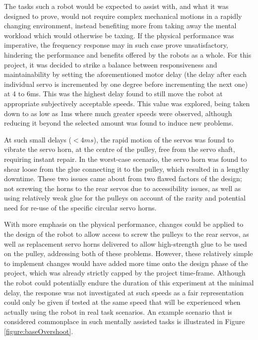 \documentclass[11pt]{article}
\begin{document}
The tasks such a robot would be expected to assist with, and what it was designed to prove, would not require complex mechanical motions in a rapidly changing environment, instead benefiting more from taking away the mental workload which would otherwise be taxing. If the physical performance was imperative, the frequency response may in such case prove unsatisfactory, hindering the performance and benefits offered by the robots as a whole. For this project, it was decided to strike a balance between responsiveness and maintainability by setting the aforementioned motor delay (the delay after each individual servo is incremented by one degree before incrementing the next one) at 4 to 6ms. This was the highest delay found to still move the robot at appropriate subjectively acceptable speeds. This value was explored, being taken down to as low as 1ms where much greater speeds were observed, although reducing it beyond the selected amount was found to induce new problems. 

At such small delays ($<4ms$), the rapid motion of the servos was found to vibrate the servo horn, at the centre of the pulley, free from the servo shaft, requiring instant repair. In the worst-case scenario, the servo horn was found to shear loose from the glue connecting it to the pulley, which resulted in a lengthy downtime. These two issues came about from two flawed factors of the design; not screwing the horns to the rear servos due to accessibility issues, as well as using relatively weak glue for the pulleys on account of the rarity and potential need for re-use of the specific circular servo horns.  

With more emphasis on the physical performance, changes could be applied to the design of the robot to allow access to screw the pulleys to the rear servos, as well as replacement servo horns delivered to allow high-strength glue to be used on the pulley, addressing both of these problems. However, these relatively simple to implement changes would have added more time onto the design phase of the project, which was already strictly capped by the project time-frame. Although the robot could potentially endure the duration of this experiment at the minimal delay, the response was not investigated at such speeds as a fair representation could only be given if tested at the same speed that will be experienced when actually using the robot in real task scenarios. An example scenario that is considered commonplace in such mentally assisted tasks is illustrated in Figure \ref{figure:baseOvershoot}.
\end{document}
